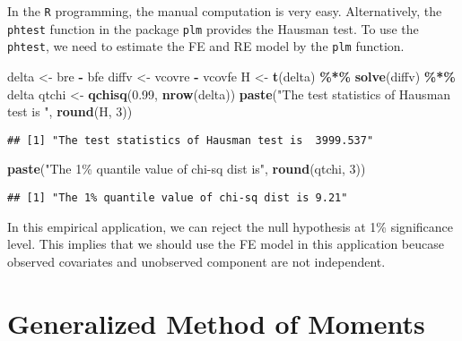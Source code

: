 \documentclass[
  12pt,
]{article}
\newenvironment{Shaded}{\begin{snugshade}}{\end{snugshade}}
\newcommand{\DecValTok}[1]{\textcolor[rgb]{0.00,0.00,0.81}{#1}}
\newcommand{\FloatTok}[1]{\textcolor[rgb]{0.00,0.00,0.81}{#1}}
\newcommand{\KeywordTok}[1]{\textcolor[rgb]{0.13,0.29,0.53}{\textbf{#1}}}
\newcommand{\NormalTok}[1]{#1}
\newcommand{\OperatorTok}[1]{\textcolor[rgb]{0.81,0.36,0.00}{\textbf{#1}}}
\newcommand{\StringTok}[1]{\textcolor[rgb]{0.31,0.60,0.02}{#1}}
\begin{document}
In the \texttt{R} programming, the manual computation is very easy.
Alternatively, the \texttt{phtest} function in the package \texttt{plm} provides the Hausman test.
To use the \texttt{phtest}, we need to estimate the FE and RE model by the \texttt{plm} function.

\begin{Shaded}
\begin{Highlighting}[]
\NormalTok{delta \textless{}{-}}\StringTok{ }\NormalTok{bre }\OperatorTok{{-}}\StringTok{ }\NormalTok{bfe}
\NormalTok{diffv \textless{}{-}}\StringTok{ }\NormalTok{vcovre }\OperatorTok{{-}}\StringTok{ }\NormalTok{vcovfe}
\NormalTok{H \textless{}{-}}\StringTok{ }\KeywordTok{t}\NormalTok{(delta) }\OperatorTok{\%*\%}\StringTok{ }\KeywordTok{solve}\NormalTok{(diffv) }\OperatorTok{\%*\%}\StringTok{ }\NormalTok{delta}
\NormalTok{qtchi \textless{}{-}}\StringTok{ }\KeywordTok{qchisq}\NormalTok{(}\FloatTok{0.99}\NormalTok{, }\KeywordTok{nrow}\NormalTok{(delta))}
\KeywordTok{paste}\NormalTok{(}\StringTok{"The test statistics of Hausman test is "}\NormalTok{, }\KeywordTok{round}\NormalTok{(H, }\DecValTok{3}\NormalTok{))}
\end{Highlighting}
\end{Shaded}

\begin{verbatim}
## [1] "The test statistics of Hausman test is  3999.537"
\end{verbatim}

\begin{Shaded}
\begin{Highlighting}[]
\KeywordTok{paste}\NormalTok{(}\StringTok{"The 1\% quantile value of chi{-}sq dist is"}\NormalTok{, }\KeywordTok{round}\NormalTok{(qtchi, }\DecValTok{3}\NormalTok{))}
\end{Highlighting}
\end{Shaded}

\begin{verbatim}
## [1] "The 1% quantile value of chi-sq dist is 9.21"
\end{verbatim}

In this empirical application, we can reject the null hypothesis at 1\% significance level.
This implies that we should use the FE model in this application
beucase observed covariates and unobserved component are not independent.

\hypertarget{generalized-method-of-moments}{%
\section{Generalized Method of Moments}\label{generalized-method-of-moments}}
\end{document}
